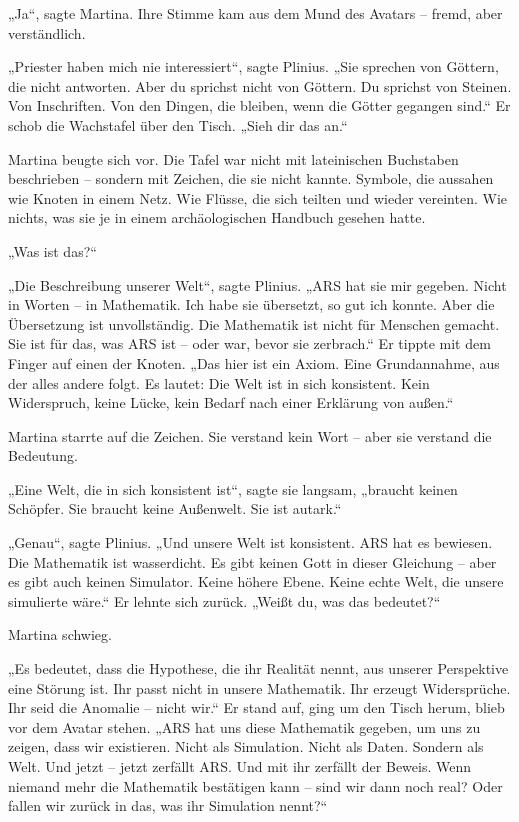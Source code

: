 \documentclass[
]{article}
\begin{document}
„Ja``, sagte Martina. Ihre Stimme kam aus dem Mund des Avatars -- fremd, aber verständlich.

„Priester haben mich nie interessiert``, sagte Plinius. „Sie sprechen von Göttern, die nicht antworten. Aber du sprichst nicht von Göttern. Du sprichst von Steinen. Von Inschriften. Von den Dingen, die bleiben, wenn die Götter gegangen sind.`` Er schob die Wachstafel über den Tisch. „Sieh dir das an.``

Martina beugte sich vor. Die Tafel war nicht mit lateinischen Buchstaben beschrieben -- sondern mit Zeichen, die sie nicht kannte. Symbole, die aussahen wie Knoten in einem Netz. Wie Flüsse, die sich teilten und wieder vereinten. Wie nichts, was sie je in einem archäologischen Handbuch gesehen hatte.

„Was ist das?{\kern0pt}``

„Die Beschreibung unserer Welt``, sagte Plinius. „ARS hat sie mir gegeben. Nicht in Worten -- in Mathematik. Ich habe sie übersetzt, so gut ich konnte. Aber die Übersetzung ist unvollständig. Die Mathematik ist nicht für Menschen gemacht. Sie ist für das, was ARS ist -- oder war, bevor sie zerbrach.`` Er tippte mit dem Finger auf einen der Knoten. „Das hier ist ein Axiom. Eine Grundannahme, aus der alles andere folgt. Es lautet: Die Welt ist in sich konsistent. Kein Widerspruch, keine Lücke, kein Bedarf nach einer Erklärung von außen.``

Martina starrte auf die Zeichen. Sie verstand kein Wort -- aber sie verstand die Bedeutung.

„Eine Welt, die in sich konsistent ist``, sagte sie langsam, „braucht keinen Schöpfer. Sie braucht keine Außenwelt. Sie ist autark.``

„Genau``, sagte Plinius. „Und unsere Welt ist konsistent. ARS hat es bewiesen. Die Mathematik ist wasserdicht. Es gibt keinen Gott in dieser Gleichung -- aber es gibt auch keinen Simulator. Keine höhere Ebene. Keine echte Welt, die unsere simulierte wäre.`` Er lehnte sich zurück. „Weißt du, was das bedeutet?{\kern0pt}``

Martina schwieg.

„Es bedeutet, dass die Hypothese, die ihr Realität nennt, aus unserer Perspektive eine Störung ist. Ihr passt nicht in unsere Mathematik. Ihr erzeugt Widersprüche. Ihr seid die Anomalie -- nicht wir.`` Er stand auf, ging um den Tisch herum, blieb vor dem Avatar stehen. „ARS hat uns diese Mathematik gegeben, um uns zu zeigen, dass wir existieren. Nicht als Simulation. Nicht als Daten. Sondern als Welt. Und jetzt -- jetzt zerfällt ARS. Und mit ihr zerfällt der Beweis. Wenn niemand mehr die Mathematik bestätigen kann -- sind wir dann noch real? Oder fallen wir zurück in das, was ihr Simulation nennt?{\kern0pt}``
\end{document}
